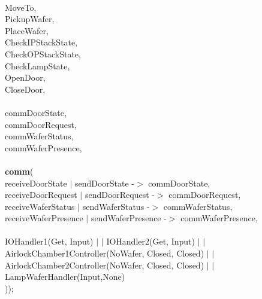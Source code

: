 \documentclass[a4paper,12pt]{article}
\begin{document}
\\						{MoveTo,
 \\ 				 	 PickupWafer,
 \\				 		 PlaceWafer,
 \\	    			 CheckIPStackState,
\\	  				 CheckOPStackState,
\\						 CheckLampState,
\\						 OpenDoor,
\\						 CloseDoor,
\\
\\						 commDoorState,
\\						 commDoorRequest,
\\						 commWaferStatus,
\\						 commWaferPresence},
\\
\\\textbf{			comm}(
\\						{receiveDoorState $|$ sendDoorState -$>$ commDoorState,
\\						receiveDoorRequest $|$ sendDoorRequest -$>$ commDoorRequest,
\\	  				 	receiveWaferStatus $|$ sendWaferStatus -$>$ commWaferStatus,
\\				 	   receiveWaferPresence $|$ sendWaferPresence -$>$ commWaferPresence},
\\
\\						 IOHandler1(Get, Input) $|$ $|$ IOHandler2(Get, Input) $|$ $|$ AirlockChamber1Controller(NoWafer, Closed, Closed) $|$ $|$ AirlockChamber2Controller(NoWafer, Closed, Closed) $|$ $|$ LampWaferHandler(Input,None)
\\					 ));
\newpage
\end{document}
